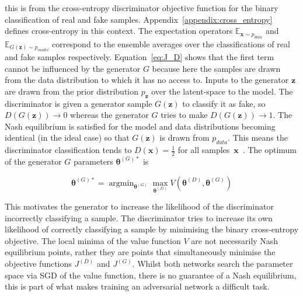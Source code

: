 \documentclass[twocolumn]{article}
\DeclareMathOperator*{\argmin}{\text{argmin}}
\numberwithin{equation}{section}
\begin{document}
this is from the cross-entropy discriminator objective function for the binary classification of real and fake 
samples. Appendix~\ref{appendix:cross_entropy} defines cross-entropy in this context. The expectation operators 
$\mathbb{E}_{\mathbf{x} \sim p_{data}}$ and $\mathbb{E}_{G(\mathbf{z}) \sim p_{model}}$ correspond to the ensemble 
averages over the classifications of real and fake samples respectively. Equation~\ref{eq:J_D} shows that the first 
term cannot be influenced by the generator $G$ because here the samples are drawn from the data distribution to which 
it has no access to. Inputs to the generator $\mathbf{z}$ are drawn from the prior distribution $p_\mathbf{z}$ over 
the latent-space to the model. The discriminator is given a generator sample $G(\mathbf{z})$ to classify it as fake, 
so $D(G(\mathbf{z})) \! \rightarrow \! 0$ whereas the generator $G$ tries to make $D(G(\mathbf{z})) \!  \rightarrow \! 1$. 
The Nash equilibrium is satisfied for the model and data distributions becoming identical (in the ideal case) so that 
$G(\mathbf{z})$ is drawn from $p_{data}$. This means the discriminator classification tends to $D(\mathbf{x}) = 
\frac{1}{2}$ for all samples~$\mathbf{x}$~\cite{gf_gan}. The optimum of the generator $G$ parameters 
$\bm{\theta}^{(G)*}$ is 

\begin{equation}
    \bm{\theta}^{(G)*} = \argmin_{\mathbf{\theta}^{(G)}}\max_{\mathbf{\theta}^{(D)}}
                          V({\mathbf{\theta}^{(D)}},{\mathbf{\theta}^{(G)}})
\end{equation}

This motivates the generator to increase the likelihood of the discriminator incorrectly classifying a sample. The 
discriminator tries to increase its own likelihood of correctly classifying a sample by minimising the binary 
cross-entropy objective. The local minima of the value function $V$ are not necessarily Nash equilibrium points, rather
they are points that simultaneously minimise the objective functions $J^{(D)}$ and $J^{(G)}$. Whilst both networks search 
the parameter space via SGD of the value function, there is no guarantee of a Nash equilibrium, this is part of what makes 
training an adversarial network a difficult task.

\end{document}
